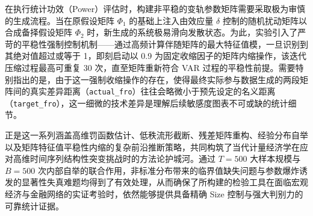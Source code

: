 在执行统计功效（Power）评估时，构建非平稳的变轨参数矩阵需要采取极为审慎的生成流程。当在原假设矩阵 $\Phi_1$ 的基础上注入由效应量 $\delta$ 控制的随机扰动矩阵以合成备择假设矩阵 $\Phi_2$ 时，新生成的系统极易滑向发散状态。为此，实验引入了严苛的平稳性强制控制机制——通过高频计算伴随矩阵的最大特征值模，一旦识别到其绝对值超过或等于 1，即刻启动以 0.9 为固定收缩因子的矩阵内缩操作，该迭代压缩过程最高可重复 30 次，直至矩阵重新符合 VAR 过程的平稳性前提。需要特别指出的是，由于这一强制收缩操作的存在，使得最终实际参与数据生成的两段矩阵间的真实差异距离（\texttt{actual\_fro}）往往会略微小于预先设定的名义距离（\texttt{target\_fro}），这一细微的技术差异是理解后续敏感度图表不可或缺的统计细节。

正是这一系列涵盖高维罚函数估计、低秩流形截断、残差矩阵重构、经验分布自举以及矩阵特征值平稳性内缩的复杂前沿推断策略，共同构筑了当代计量经济学在应对高维时间序列结构性突变挑战时的方法论护城河。通过 $T=500$ 大样本规模与 $B=500$ 次内部自举的联合作用，非标准分布带来的临界值缺失问题与参数爆炸诱发的显著性失真难题均得到了有效处理，从而确保了所构建的检验工具在面临宏观经济与金融网络的实证考验时，依然能够提供具备精确 Size 控制与强大判别力的可靠统计证据。

